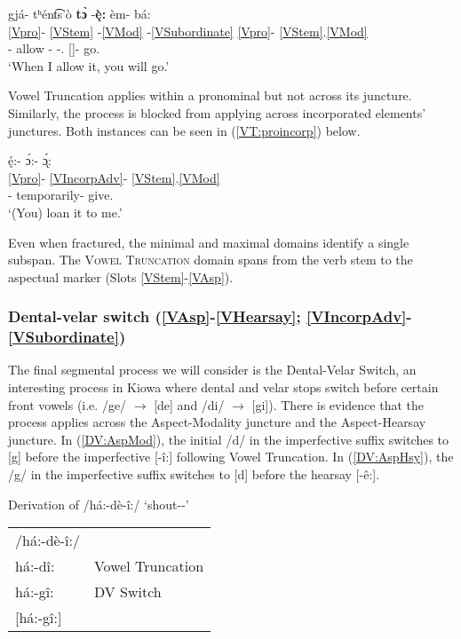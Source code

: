 \documentclass[output=paper]{langscibook}
\begin{document}
\ea \label{VT:sub}
\glll gjá- tʰént͡s'ò \textbf{t\`{ɔ}} -\textbf{\k{è}:} èm- bá:\\
{\ref{Vpro}}- \ref{VStem} -\ref{VMod} -\ref{VSubordinate} {\ref{Vpro}}- \ref{VStem}.\ref{VMod}\\
[(\First\Sg/\Aarg):\Second,\Third\Sg:/\Parg:\Sg/\Obj]- allow -{\Fut} -{\When}.{\Diff} [\Second\Sg]- go.{\Imp}\\
\trans `When I allow it, you will go.' \citep[][128]{Miller:2018}  %
\z 

\noindent Vowel Truncation applies within a pronominal but not across its juncture. Similarly, the process is blocked from applying across incorporated elements' junctures. Both instances can be seen in (\ref{VT:proincorp}) below.

\ea \label{VT:proincorp}
\glll \k{é}:- \'{ɔ}:- \k{\'{ɔ}}:\\
{\ref{Vpro}}- \ref{VIncorpAdv}- \ref{VStem}.\ref{VMod}\\
[(\Second,\Third\Sg/\Aarg):\First\Sg/\Parg:$\varnothing$/\Obj]- temporarily- give.{\Imp}\\
\trans `(You) loan it to me.' \citep[adapted from][]{Miller:2018} %
\z 

\noindent Even when fractured, the minimal and maximal domains identify a single subspan. The \textsc{Vowel Truncation} domain spans from the verb stem to the aspectual marker (Slots \ref{VStem}-\ref{VAsp}). 

\subsubsection{Dental-velar switch (\ref{VAsp}-\ref{VHearsay}; \ref{VIncorpAdv}-\ref{VSubordinate})} \label{sec:DV}

The final segmental process we will consider is the Dental-Velar Switch, an interesting process in Kiowa where dental and velar stops switch before certain front vowels (i.e. /ge/ $\rightarrow$ [de] and /di/ $\rightarrow$ [gi]). There is evidence that the process applies across the Aspect-Modality juncture and the Aspect-Hearsay juncture. In (\ref{DV:AspMod}), the initial /d/ in the imperfective suffix switches to [g] before the imperfective [-î:] following Vowel Truncation. In (\ref{DV:AspHsy}), the /g/ in the imperfective suffix switches to [d] before the hearsay [-ê:].

\ea Derivation of /há:-dè-î:/ `shout-\Ipfv-\Imp' \label{DV:AspMod}
\begin{tabular}{ll} 
     /há:-dè-î:/ &  \\
     há:-dî: & Vowel Truncation \\
     há:-gî: & DV Switch \\
     {[há:-gî:]} & \\
\end{tabular}
\z 
\end{document}
